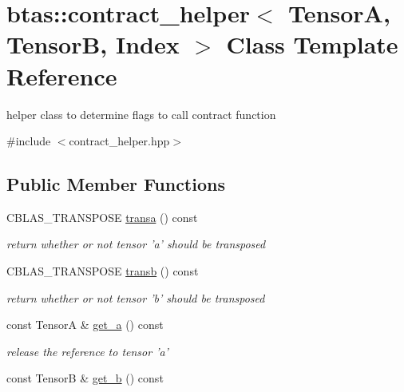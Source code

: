 \hypertarget{classbtas_1_1contract__helper}{
\section{btas::contract\_\-helper$<$ TensorA, TensorB, Index $>$ Class Template Reference}
\label{classbtas_1_1contract__helper}
}


helper class to determine flags to call contract function  


{\ttfamily \#include $<$contract\_\-helper.hpp$>$}\subsection*{Public Member Functions}
\begin{DoxyCompactItemize}
\item 
\hypertarget{classbtas_1_1contract__helper_ac98eb37594c1b24be2c663bc3ca5d6ec}{
CBLAS\_\-TRANSPOSE \hyperlink{classbtas_1_1contract__helper_ac98eb37594c1b24be2c663bc3ca5d6ec}{transa} () const }
\label{classbtas_1_1contract__helper_ac98eb37594c1b24be2c663bc3ca5d6ec}

\begin{DoxyCompactList}\small\item\em return whether or not tensor 'a' should be transposed \item\end{DoxyCompactList}\item 
\hypertarget{classbtas_1_1contract__helper_a616222e676a688b0c6f162b6de7f59f1}{
CBLAS\_\-TRANSPOSE \hyperlink{classbtas_1_1contract__helper_a616222e676a688b0c6f162b6de7f59f1}{transb} () const }
\label{classbtas_1_1contract__helper_a616222e676a688b0c6f162b6de7f59f1}

\begin{DoxyCompactList}\small\item\em return whether or not tensor 'b' should be transposed \item\end{DoxyCompactList}\item 
\hypertarget{classbtas_1_1contract__helper_a7d3ef84cc81832d8f1b57b8bfea1e6eb}{
const TensorA \& \hyperlink{classbtas_1_1contract__helper_a7d3ef84cc81832d8f1b57b8bfea1e6eb}{get\_\-a} () const }
\label{classbtas_1_1contract__helper_a7d3ef84cc81832d8f1b57b8bfea1e6eb}

\begin{DoxyCompactList}\small\item\em release the reference to tensor 'a' \item\end{DoxyCompactList}\item 
\hypertarget{classbtas_1_1contract__helper_ad3a459c47ffd3ef3d68ad12746c69e77}{
const TensorB \& \hyperlink{classbtas_1_1contract__helper_ad3a459c47ffd3ef3d68ad12746c69e77}{get\_\-b} () const }
\label{classbtas_1_1contract__helper_ad3a459c47ffd3ef3d68ad12746c69e77}


\end{DoxyCompactItemize}
